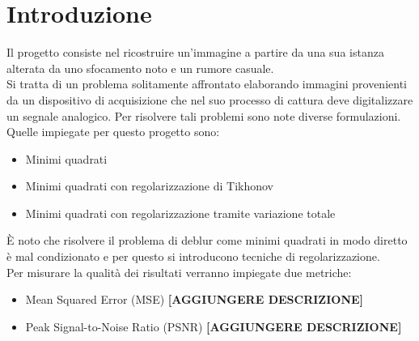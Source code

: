\documentclass[11pt]{article}
\begin{document}
\section*{Introduzione}
Il progetto consiste nel ricostruire un'immagine a partire da una sua istanza alterata da uno sfocamento noto e un rumore casuale.\\
Si tratta di un problema solitamente affrontato elaborando immagini provenienti da un dispositivo di acquisizione che nel suo processo di cattura deve digitalizzare un segnale analogico. 
Per risolvere tali problemi sono note diverse formulazioni. Quelle impiegate per questo progetto sono:
\begin{itemize}
    \setlength\itemsep{0.05cm}
    \item Minimi quadrati
    \item Minimi quadrati con regolarizzazione di Tikhonov
    \item Minimi quadrati con regolarizzazione tramite variazione totale
\end{itemize}
È noto che risolvere il problema di deblur come minimi quadrati in modo diretto è mal condizionato e per questo si introducono tecniche di regolarizzazione.\\
Per misurare la qualità dei risultati verranno impiegate due metriche:
\begin{itemize}
    \setlength\itemsep{0.05cm}
    \item Mean Squared Error (MSE) \textbf{[AGGIUNGERE DESCRIZIONE]}
    \item Peak Signal-to-Noise Ratio (PSNR) \textbf{[AGGIUNGERE DESCRIZIONE]}
\end{itemize}
\end{document}

